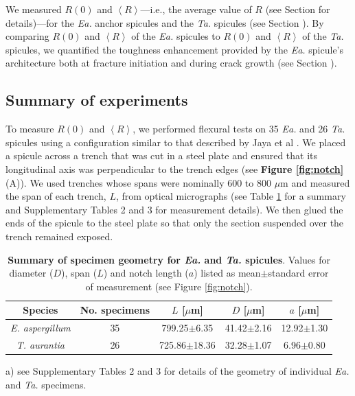 \documentclass[12pt,onecolumn]{article}
\makeatletter
\DeclareRobustCommand*{\nameref}[1]{%
      \emph{\myorg@nameref{#1}}%
    }%
\newcommand{\TA}{\textit{Ta.\@}\xspace}
\newcommand{\EA}{\textit{Ea.\@}\xspace}
\newcommand{\ra}[1]{\renewcommand{\arraystretch}{#1}}
\makeatother
\begin{document}
We measured $R(0)$ and $\left< R \right>$---i.e., the average value of $R$ (see Section \nameref{sec:avgR} for details)---for the \EA anchor spicules and the \TA spicules (see Section \nameref{sec:res}). By comparing $R(0)$ and $\left< R \right>$ of the \EA spicules to $R(0)$ and $\left< R \right>$ of the \TA spicules, we quantified the toughness enhancement provided by the \EA spicule's architecture both at fracture initiation and during crack growth (see Section \nameref{sec:Rcomp}).

\subsection*{Summary of experiments}
To measure $R(0)$ and $\left< R \right>$, we performed flexural tests on 35 \EA and 26 \TA spicules using a configuration similar to that described  by Jaya et al \cite{jaya2014crack,jaya2015can}. We placed a spicule across a trench that was cut in a steel plate and ensured that its longitudinal axis was perpendicular to the trench edges (see {\bf Figure \ref{fig:notch}} (A)). We used trenches whose spans were nominally 600 to 800 $\mu$m and measured the span of each trench, $L$, from optical micrographs (see Table \ref{tab:spiculegeom} for a summary and Supplementary Tables 2 and 3 for measurement details). We then glued the ends of the spicule to the steel plate so that only the section suspended over the trench remained exposed. 
%
\begin{table}
\centering
\ra{1.25}
\begin{threeparttable}[t]
\begin{tabular}{ccccc}
\toprule
Species & No. specimens & $L$ [$\mu$m] & $D$ [$\mu$m] & $a$ [$\mu$m]\\
\midrule
\textit{E. aspergillum} & 35 & 799.25$\pm$6.35 & 41.42$\pm$2.16 & 12.92$\pm$1.30\\
\textit{T. aurantia} & 26 & 725.86$\pm$18.36 & 32.28$\pm$1.07 & 6.96$\pm$0.80\\
\bottomrule
\end{tabular}
\begin{tablenotes}
\item[a)] {\footnotesize see Supplementary Tables 2 and 3 for details of the geometry of individual \EA and \TA specimens.}
\end{tablenotes}
\end{threeparttable}
\caption{\textbf{Summary of specimen geometry for \EA and \TA spicules}. Values for diameter ($D$), span ($L$) and notch length ($a$) listed as mean$\pm$standard error of measurement (see Figure \ref{fig:notch}).}
\label{tab:spiculegeom}
\end{table}
\end{document}
